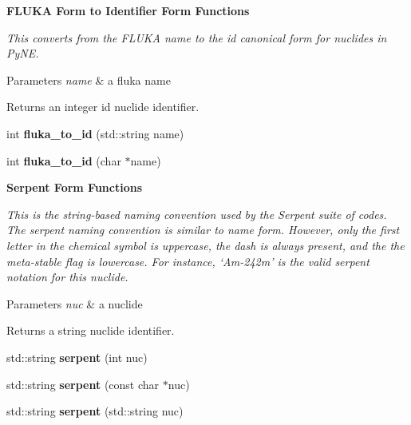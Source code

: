 \begin{Indent}{\bf F\+L\+U\+KA Form to Identifier Form Functions}\par
{\em This converts from the F\+L\+U\+KA name to the id canonical form for nuclides in Py\+NE. 
\begin{DoxyParams}{Parameters}
{\em name} & a fluka name \\
\hline
\end{DoxyParams}
\begin{DoxyReturn}{Returns}
an integer id nuclide identifier. 
\end{DoxyReturn}
}\begin{DoxyCompactItemize}
\item 
int {\bfseries fluka\+\_\+to\+\_\+id} (std\+::string name)\hypertarget{namespacepyne_1_1nucname_a9938dd663fa7160312e033ea088423b8}{}\label{namespacepyne_1_1nucname_a9938dd663fa7160312e033ea088423b8}

\item 
int {\bfseries fluka\+\_\+to\+\_\+id} (char $\ast$name)\hypertarget{namespacepyne_1_1nucname_a5df41bf3c3d1b907a89c49a2485b6b68}{}\label{namespacepyne_1_1nucname_a5df41bf3c3d1b907a89c49a2485b6b68}

\end{DoxyCompactItemize}
\end{Indent}
\begin{Indent}{\bf Serpent Form Functions}\par
{\em This is the string-\/based naming convention used by the Serpent suite of codes. The serpent naming convention is similar to name form. However, only the first letter in the chemical symbol is uppercase, the dash is always present, and the the meta-\/stable flag is lowercase. For instance, ‘\+Am-\/242m’ is the valid serpent notation for this nuclide. 
\begin{DoxyParams}{Parameters}
{\em nuc} & a nuclide \\
\hline
\end{DoxyParams}
\begin{DoxyReturn}{Returns}
a string nuclide identifier. 
\end{DoxyReturn}
}\begin{DoxyCompactItemize}
\item 
std\+::string {\bfseries serpent} (int nuc)\hypertarget{namespacepyne_1_1nucname_add93b13ec55e918550681062e48e1fd2}{}\label{namespacepyne_1_1nucname_add93b13ec55e918550681062e48e1fd2}

\item 
std\+::string {\bfseries serpent} (const char $\ast$nuc)\hypertarget{namespacepyne_1_1nucname_aac7736b1f7f90041ec2d719bf2a4fada}{}\label{namespacepyne_1_1nucname_aac7736b1f7f90041ec2d719bf2a4fada}

\item 
std\+::string {\bfseries serpent} (std\+::string nuc)\hypertarget{namespacepyne_1_1nucname_a6c17212425ae2bc60437fa5c96f0b8de}{}\label{namespacepyne_1_1nucname_a6c17212425ae2bc60437fa5c96f0b8de}

\end{DoxyCompactItemize}
\end{Indent}
